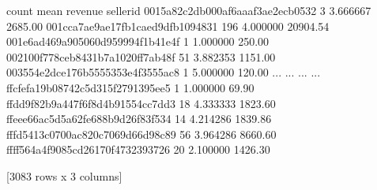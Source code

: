 \documentclass[letterpaper,10pt,english]{jupyterBook}
\begin{document}
\begin{sphinxVerbatim}[commandchars=\\\{\}]
  \PYG{p}{[}\PYG{p}{[}\PYG{p}{]}\PYG{p}{]}\PYG{p}{[}\PYG{p}{]}\PYG{p}{[} \PYG{p}{]}
\end{sphinxVerbatim}

\begin{sphinxVerbatim}[commandchars=\\\{\}]
  \PYG{p}{[}\PYG{p}{[}\PYG{p}{]}\PYG{p}{]}\PYG{p}{[}\PYG{p}{]}
  
\end{sphinxVerbatim}

\begin{sphinxVerbatim}[commandchars=\\\{\}]
     
\end{sphinxVerbatim}

\begin{sphinxVerbatim}[commandchars=\\\{\}]
                                  count      mean   revenue
seller\PYGZus{}id                                                  
0015a82c2db000af6aaaf3ae2ecb0532      3  3.666667   2685.00
001cca7ae9ae17fb1caed9dfb1094831    196  4.000000  20904.54
001e6ad469a905060d959994f1b41e4f      1  1.000000    250.00
002100f778ceb8431b7a1020ff7ab48f     51  3.882353   1151.00
003554e2dce176b5555353e4f3555ac8      1  5.000000    120.00
...                                 ...       ...       ...
ffcfefa19b08742c5d315f2791395ee5      1  1.000000     69.90
ffdd9f82b9a447f6f8d4b91554cc7dd3     18  4.333333   1823.60
ffeee66ac5d5a62fe688b9d26f83f534     14  4.214286   1839.86
fffd5413c0700ac820c7069d66d98c89     56  3.964286   8660.60
ffff564a4f9085cd26170f4732393726     20  2.100000   1426.30

[3083 rows x 3 columns]
\end{sphinxVerbatim}
\end{document}
